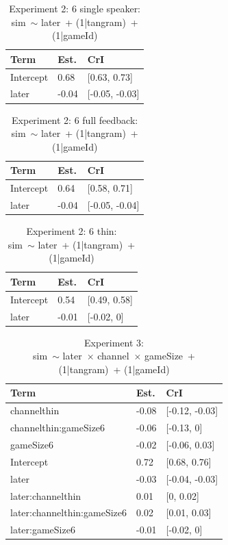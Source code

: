 \documentclass[
  english,
  a4paper,
]{article}
\begin{document}
\begin{table}[h!]

\caption{\label{tab:unnamed-chunk-16}Experiment 2: 6 single speaker:\\ sim~$\sim$ later~+ (1|tangram)~+ (1|gameId)}
\centering
\begin{tabular}[t]{lll}
\toprule
Term & Est. & CrI\\
\midrule
Intercept & 0.68 & {}[0.63, 0.73]\\
later & -0.04 & {}[-0.05, -0.03]\\
\bottomrule
\end{tabular}
\end{table}

\begin{table}[h!]

\caption{\label{tab:unnamed-chunk-16}Experiment 2: 6 full feedback:\\ sim~$\sim$ later~+ (1|tangram)~+ (1|gameId)}
\centering
\begin{tabular}[t]{lll}
\toprule
Term & Est. & CrI\\
\midrule
Intercept & 0.64 & {}[0.58, 0.71]\\
later & -0.04 & {}[-0.05, -0.04]\\
\bottomrule
\end{tabular}
\end{table}

\begin{table}[h!]

\caption{\label{tab:unnamed-chunk-16}Experiment 2: 6 thin:\\ sim~$\sim$ later~+ (1|tangram)~+ (1|gameId)}
\centering
\begin{tabular}[t]{lll}
\toprule
Term & Est. & CrI\\
\midrule
Intercept & 0.54 & {}[0.49, 0.58]\\
later & -0.01 & {}[-0.02, 0]\\
\bottomrule
\end{tabular}
\end{table}

\begin{table}[h!]

\caption{\label{tab:unnamed-chunk-16}Experiment 3:\\ sim~$\sim$ later~$\times$ channel~$\times$ gameSize~+ (1|tangram)~+ (1|gameId)}
\centering
\begin{tabular}[t]{lll}
\toprule
Term & Est. & CrI\\
\midrule
channelthin & -0.08 & {}[-0.12, -0.03]\\
channelthin:gameSize6 & -0.06 & {}[-0.13, 0]\\
gameSize6 & -0.02 & {}[-0.06, 0.03]\\
Intercept & 0.72 & {}[0.68, 0.76]\\
later & -0.03 & {}[-0.04, -0.03]\\
\addlinespace
later:channelthin & 0.01 & {}[0, 0.02]\\
later:channelthin:gameSize6 & 0.02 & {}[0.01, 0.03]\\
later:gameSize6 & -0.01 & {}[-0.02, 0]\\
\bottomrule
\end{tabular}
\end{table}
\end{document}
